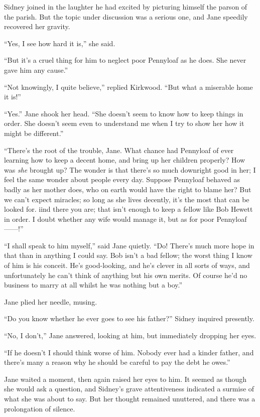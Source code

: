 Sidney joined in the laughter he had
{\protect\hypertarget{50}{}{}}excited by picturing himself the parson of
the parish. But the topic under discussion was a serious one, and Jane
speedily recovered her gravity.

``Yes, I see how hard it is,'' she said.

``But it's a cruel thing for him to neglect poor Pennyloaf as he does.
She never gave him any cause.''

``Not knowingly, I quite believe,'' replied Kirkwood. ``But what a
miserable home it is!''

``Yes.'' Jane shook her head. ``She doesn't seem to know how to keep
things in order. She doesn't seem even to understand me when I try to
show her how it might be different.''

``There's the root of the trouble, Jane. What chance had Pennyloaf of
ever learning how to keep a decent home, and bring up her children
properly? How was \emph{she} brought up? The wonder is that there's so
much downright good in her; I feel the same wonder about people every
day. Suppose Pennyloaf behaved as badly as her mother
{\protect\hypertarget{51}{}{}}does, who on earth would have the right to
blame her? But we can't expect miracles; so long as she lives decently,
it's the most that can be looked for. iind there you are; that isn't
enough to keep a fellow like Bob Hewett in order. I doubt whether any
wife would manage it, but as for poor Pennyloaf{{------}}!''

``I shall speak to him myself,'' said Jane quietly. ``Do! There's much
more hope in that than in anything I could say. Bob isn't a bad fellow;
the worst thing I know of him is his conceit. He's good-looking, and
he's clever in all sorts of ways, and unfortunately he can't think of
anything but his own merits. Of course he'd no business to marry at all
whilst he was nothing but a boy.''

Jane plied her needle, musing.

``Do you know whether he ever goes to see his father?'' Sidney inquired
presently.

``No, I don't,'' Jane answered, looking at him, but immediately dropping
her eyes.

``If he doesn't I should think worse of him.
{\protect\hypertarget{52}{}{}}Nobody ever had a kinder father, and
there's many a reason why he should be careful to pay the debt he
owes.''

Jane waited a moment, then again raised her eyes to him. It seemed as
though she would ask a question, and Sidney's grave attentiveness
indicated a surmise of what she was about to say. But her thought
remained unuttered, and there was a prolongation of silence.

